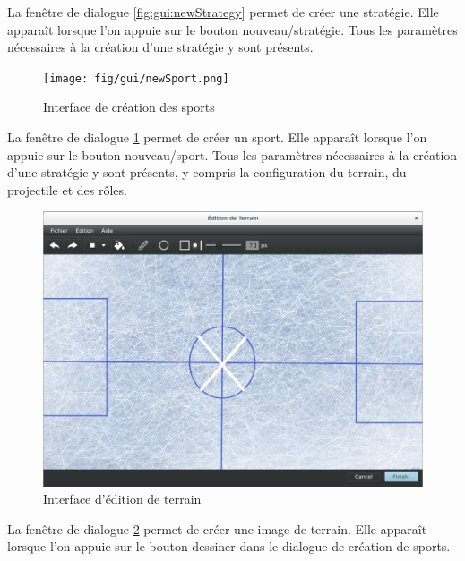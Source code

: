 La fenêtre de dialogue \ref{fig:gui:newStrategy} permet de créer une stratégie.
Elle apparaît lorsque l'on appuie sur le bouton nouveau/stratégie.
Tous les paramètres nécessaires à la création d'une stratégie y sont présents.

\begin{figure}[htpb]
    \centering
    \texttt{[image: fig/gui/newSport.png]}
    \caption{Interface de création des sports}
    \label{fig:gui:newSport}
\end{figure}

La fenêtre de dialogue \ref{fig:gui:newSport} permet de créer un sport.
Elle apparaît lorsque l'on appuie sur le bouton nouveau/sport.
Tous les paramètres nécessaires à la création d'une stratégie y sont présents, y compris la configuration du terrain, du projectile et des rôles.

\newpage

\begin{figure}[htpb]
    \centering
    \includegraphics[scale=0.35]{fig/gui/gui_edit_field.png}
    \caption{Interface d'édition de terrain}
    \label{fig:gui:terrain}
\end{figure}

La fenêtre de dialogue \ref{fig:gui:terrain} permet de créer une image de terrain.
Elle apparaît lorsque l'on appuie sur le bouton dessiner dans le dialogue de création de sports.

